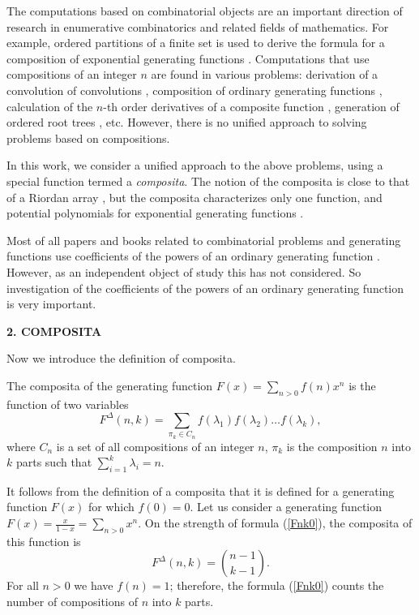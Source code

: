 \documentclass[12pt]{article}
\begin{document}
The computations based on combinatorial objects are an important direction of research in enumerative combinatorics and related fields of mathematics. For example, ordered partitions of a finite set is used to derive the formula for a composition of exponential generating functions \cite{Stanley_v2}. 
Computations that use compositions of an integer $n$ are found in various problems: derivation of a convolution of convolutions \cite{ConcreteMath}, composition of ordinary generating functions \cite{Egor}, calculation of the $n$-th order derivatives of a composite function \cite{WJohnson}, generation of ordered root trees \cite{Kru2010}, etc.
However, there is no unified approach to solving problems based on compositions. 

In this work, we consider a unified approach to the above problems, using a special function termed a \textit{composita}. 
The notion of the composita is close to that of a Riordan array \cite{Shapiro,Sprugnoli}, but the composita characterizes only one function, and  potential polynomials for exponential generating functions \cite{Comtet}.

Most of all papers and books related to combinatorial problems and generating functions use coefficients of the powers of an ordinary generating function \cite{Stanley_v2,Egor,Comtet,Flajolet}. However, as an independent object of study this has not considered. So investigation of the coefficients of the powers of an ordinary generating function is very important.

\vspace{1.5cc}
\begin{center}
{\bf 2. COMPOSITA}
\end{center}

Now we introduce the definition of composita.
\begin{definition} The composita of the generating function $F(x)=\sum_{n>0}f(n)x^n$ is the function of two variables
\begin{equation}
\label{Fnk0}F^{\Delta}(n,k)=\sum_{\pi_k \in C_n}{f(\lambda_1)f(\lambda_2)\ldots f(\lambda_k)},
\end{equation}
where $C_n$ is a set of all compositions of an integer $n$, $\pi_k$ is the composition $n$ into $k$ parts such that $\sum_{i=1}^k\lambda_i=n$.
\end{definition}

It follows from the definition of a composita that it is defined for a generating function $F(x)$ for which $f(0)=0$. Let us consider a generating function $F(x)=\frac{x}{1-x}=\sum_{n>0}x^n$. On the strength of formula (\ref{Fnk0}), the composita of this function is
$$
 F^{\Delta}(n,k)={n-1 \choose k-1}.
$$
For all $n>0$ we have $f(n)=1$; therefore, the formula (\ref{Fnk0}) counts the number of compositions of $n$ into $k$ parts. 
\end{document}
